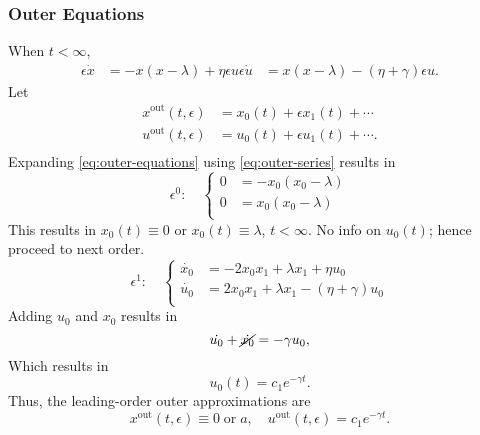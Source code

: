 \documentclass[12pt,twoside]{article}
\begin{document}
\subsubsection{Outer Equations}
When $t<\infty$,
\begin{equation}
  \label{eq:outer-equations}
  \begin{aligned}
    \epsilon\dot{x} &= -x(x-\lambda)+\eta\epsilon u
    \epsilon\dot{u} &= x(x-\lambda)-(\eta+\gamma)\epsilon u.
  \end{aligned}
\end{equation}
Let
\begin{equation}
  \label{eq:outer-series}
  \begin{aligned}
    x^{\text{out}}(t,\epsilon) &= x_0(t) + \epsilon x_1(t)+\cdots \\
    u^{\text{out}}(t,\epsilon) &= u_0(t) + \epsilon u_1(t)+\cdots. \\
  \end{aligned}
\end{equation}
Expanding \cref{eq:outer-equations} using \cref{eq:outer-series} results in
\begin{equation*}
  \epsilon^0:\quad \left\{
    \begin{aligned}
      0 &= -x_0(x_0-\lambda) \\
      0 &= x_0(x_0-\lambda) \\
    \end{aligned}
\right.
\end{equation*}
This results in $x_0(t)\equiv0$ or $x_0(t)\equiv\lambda$, $t<\infty$. No info on
$u_0(t)$; hence proceed to next order.
\begin{equation*}
  \epsilon^1:\quad \left\{
    \begin{aligned}
      \dot{x_0} &= -2x_0x_1+\lambda x_1+\eta u_0 \\
      \dot{u_0} &= 2x_0x_1+\lambda x_1 - (\eta + \gamma) u_0 \\
    \end{aligned}
\right.
\end{equation*}
Adding $u_0$ and $x_0$ results in
$$\dot{u_0}+\cancel{\dot{x_0}}=-\gamma u_0,$$
Which results in
\begin{equation*}
  u_0(t) = c_1e^{-\gamma t}.
\end{equation*}
Thus, the leading-order outer approximations are
\begin{equation*}
  x^{\text{out}}(t,\epsilon) \equiv 0 \;\text{or}\; a,\quad u^{\text{out}}(t,\epsilon)=c_1e^{-\gamma t}.
\end{equation*}
\end{document}
